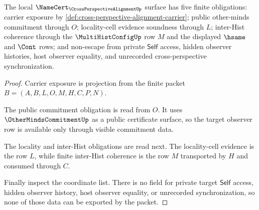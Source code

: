 \begin{theorem}
\label{thm:cross-perspective-alignment-namecert-obligations}
The local $\NameCert_{\CrossPerspectiveAlignmentUp}$ surface has five finite obligations: carrier exposure by \autoref{def:cross-perspective-alignment-carrier}; public other-minds commitment through $O$; locality-cell evidence soundness through $L$; inter-Hist coherence through the $\MultiHistConfigUp$ row $M$ and the displayed $\hsame$ and $\Cont$ rows; and non-escape from private $\mathsf{Self}$ access, hidden observer histories, host observer equality, and unrecorded cross-perspective synchronization.
\end{theorem}
\begin{proof}
Carrier exposure is projection from the finite packet $B=(A,B,L,O,M,H,C,P,N)$.

The public commitment obligation is read from $O$. It uses $\OtherMindsCommitmentUp$ as a public certificate surface, so the target observer row is available only through visible commitment data.

The locality and inter-Hist obligations are read next. The locality-cell evidence is the row $L$, while finite inter-Hist coherence is the row $M$ transported by $H$ and consumed through $C$.

Finally inspect the coordinate list. There is no field for private target $\mathsf{Self}$ access, hidden observer history, host observer equality, or unrecorded synchronization, so none of those data can be exported by the packet.
\end{proof}

